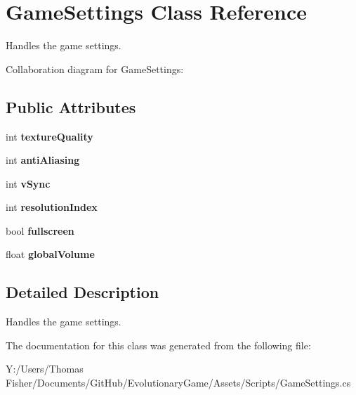 \hypertarget{class_game_settings}{}\section{Game\+Settings Class Reference}
\label{class_game_settings}


Handles the game settings.  




Collaboration diagram for Game\+Settings\+:
\subsection*{Public Attributes}
\begin{DoxyCompactItemize}
\item 
\mbox{\label{class_game_settings_a04d31e94fa2b8f63162fa6665693185c}} 
int {\bfseries texture\+Quality}
\item 
\mbox{\label{class_game_settings_a4bb98b524482d324a8a998378c0cbfc5}} 
int {\bfseries anti\+Aliasing}
\item 
\mbox{\label{class_game_settings_a9a7ad0eaf12caa2ab5669a261bc29a6f}} 
int {\bfseries v\+Sync}
\item 
\mbox{\label{class_game_settings_ae8b3f7d7c601c87a936146420ed12ee1}} 
int {\bfseries resolution\+Index}
\item 
\mbox{\label{class_game_settings_a34b5a36a0be6ded2b302ebc0f818401c}} 
bool {\bfseries fullscreen}
\item 
\mbox{\label{class_game_settings_a859eadc59901c35d0e6621f5a7d8e5a2}} 
float {\bfseries global\+Volume}
\end{DoxyCompactItemize}


\subsection{Detailed Description}
Handles the game settings. 



The documentation for this class was generated from the following file\+:\begin{DoxyCompactItemize}
\item 
Y\+:/\+Users/\+Thomas Fisher/\+Documents/\+Git\+Hub/\+Evolutionary\+Game/\+Assets/\+Scripts/Game\+Settings.\+cs\end{DoxyCompactItemize}
